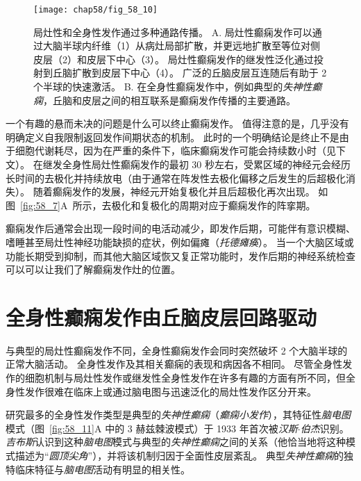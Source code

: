 \begin{figure}[htbp]
	\centering
	\texttt{[image: chap58/fig\_58\_10]}
	\caption{局灶性和全身性发作通过多种通路传播\cite{lothman1993pathophysiology}。
		A. 局灶性癫痫发作可以通过大脑半球内纤维（1）从病灶局部扩散，并更远地扩散至等位对侧皮层（2）和皮层下中心（3）。
		局灶性癫痫发作的继发性泛化通过投射到丘脑扩散到皮层下中心（4）。
		广泛的丘脑皮层互连随后有助于 2 个半球的快速激活。
		B. 在全身性癫痫发作中，例如典型的\textit{失神性癫痫}，丘脑和皮层之间的相互联系是癫痫发作传播的主要通路。}
	\label{fig:58_10}
\end{figure}


一个有趣的悬而未决的问题是什么可以终止癫痫发作。
值得注意的是，几乎没有明确定义自我限制返回发作间期状态的机制。
此时的一个明确结论是终止不是由于细胞代谢耗尽，因为在严重的条件下，临床癫痫发作可能会持续数小时（见下文）。
在继发全身性局灶性癫痫发作的最初 30 秒左右，受累区域的神经元会经历长时间的去极化并持续放电（由于通常在阵发性去极化偏移之后发生的后超极化消失）。
随着癫痫发作的发展，神经元开始复极化并且后超极化再次出现。
如图~\ref{fig:58_7}A~所示，去极化和复极化的周期对应于癫痫发作的阵挛期。


癫痫发作后通常会出现一段时间的电活动减少，即发作后期，可能伴有意识模糊、嗜睡甚至局灶性神经功能缺损的症状，例如偏瘫（\textit{托德瘫痪}）。
当一个大脑区域或功能长期受到抑制，而其他大脑区域恢又复正常功能时，发作后期的神经系统检查可以可以让我们了解癫痫发作灶的位置。



\section{全身性癫痫发作由丘脑皮层回路驱动}

与典型的局灶性癫痫发作不同，全身性癫痫发作会同时突然破坏 2 个大脑半球的正常大脑活动。
全身性发作及其相关癫痫的表现和病因各不相同。
尽管全身性发作的细胞机制与局灶性发作或继发性全身性发作在许多有趣的方面有所不同，但全身性发作很难在临床上或通过脑电图与迅速泛化的局灶性发作区分开来。


研究最多的全身性发作类型是典型的\textit{失神性癫痫}（\textit{癫痫小发作}），其特征性\textit{脑电图}模式（图~\ref{fig:58_11}A 中的 3 赫兹棘波模式）于 1933 年首次被\textit{汉斯$\cdot$伯杰}识别。
\textit{吉布斯}认识到这种\textit{脑电图}模式与典型的\textit{失神性癫痫}之间的关系（他恰当地将这种模式描述为“\textit{圆顶尖角}”），并将该机制归因于全面性皮层紊乱。
典型\textit{失神性癫痫}的独特临床特征与\textit{脑电图}活动有明显的相关性。


